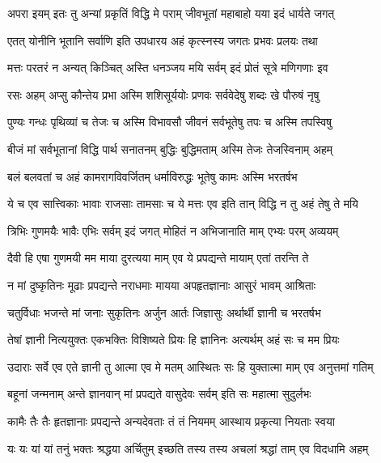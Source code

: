\twolineshloka
{अपरा इयम् इतः तु अन्यां प्रकृतिं विद्धि मे पराम्}
{जीवभूतां महाबाहो यया इदं धार्यते जगत्}%

\twolineshloka
{एतत् योनीनि भूतानि सर्वाणि इति उपधारय}
{अहं कृत्स्नस्य जगतः प्रभवः प्रलयः तथा}%

\twolineshloka
{मत्तः परतरं न अन्यत् किञ्चित् अस्ति धनञ्जय}
{मयि सर्वम् इदं प्रोतं सूत्रे मणिगणाः इव}%

\twolineshloka
{रसः अहम् अप्सु कौन्तेय प्रभा अस्मि शशिसूर्ययोः}
{प्रणवः सर्ववेदेषु शब्दः खे पौरुषं नृषु}%

\twolineshloka
{पुण्यः गन्धः पृथिव्यां च तेजः च अस्मि विभावसौ}
{जीवनं सर्वभूतेषु तपः च अस्मि तपस्विषु}%

\twolineshloka
{बीजं मां सर्वभूतानां विद्धि पार्थ सनातनम्}
{बुद्धिः बुद्धिमताम् अस्मि तेजः तेजस्विनाम् अहम्}%

\twolineshloka
{बलं बलवतां च अहं कामरागविवर्जितम्}
{धर्माविरुद्धः भूतेषु कामः अस्मि भरतर्षभ}%

\twolineshloka
{ये च एव सात्त्विकाः भावाः राजसाः तामसाः च ये}
{मत्तः एव इति तान् विद्धि न तु अहं तेषु ते मयि}%

\twolineshloka
{त्रिभिः गुणमयैः भावैः एभिः सर्वम् इदं जगत्}
{मोहितं न अभिजानाति माम् एभ्यः परम् अव्ययम्}%

\twolineshloka
{दैवी हि एषा गुणमयी मम माया दुरत्यया}
{माम् एव ये प्रपद्यन्ते मायाम् एतां तरन्ति ते}%

\twolineshloka
{न मां दुष्कृतिनः मूढाः प्रपद्यन्ते नराधमाः}
{मायया अपहृतज्ञानाः आसुरं भावम् आश्रिताः}%

\twolineshloka
{चतुर्विधाः भजन्ते मां जनाः सुकृतिनः अर्जुन}
{आर्तः जिज्ञासुः अर्थार्थी ज्ञानी च भरतर्षभ}%

\twolineshloka
{तेषां ज्ञानी नित्ययुक्तः एकभक्तिः विशिष्यते}
{प्रियः हि ज्ञानिनः अत्यर्थम् अहं सः च मम प्रियः}%

\twolineshloka
{उदाराः सर्वे एव एते ज्ञानी तु आत्मा एव मे मतम्}
{आस्थितः सः हि युक्तात्मा माम् एव अनुत्तमां गतिम्}%

\twolineshloka
{बहूनां जन्मनाम् अन्ते ज्ञानवान् मां प्रपद्यते}
{वासुदेवः सर्वम् इति सः महात्मा सुदुर्लभः}%

\twolineshloka
{कामैः तैः तैः हृतज्ञानाः प्रपद्यन्ते अन्यदेवताः}
{तं तं नियमम् आस्थाय प्रकृत्या नियताः स्वया}%

\twolineshloka
{यः यः यां यां तनुं भक्तः श्रद्धया अर्चितुम् इच्छति}
{तस्य तस्य अचलां श्रद्धां ताम् एव विदधामि अहम्}%

